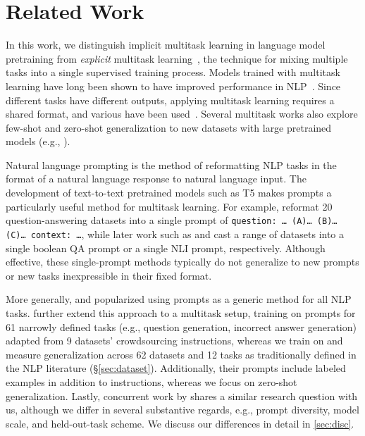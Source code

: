 \section{Related Work}\label{sec:related}

In this work, we distinguish implicit multitask learning in language model pretraining from \textit{explicit} multitask learning~\citep{DBLP:journals/ml/Caruana97}, the technique for mixing multiple tasks into a single supervised training process. Models trained with multitask learning have long been shown to have improved performance in NLP~\citep{DBLP:conf/icml/CollobertW08}. Since different tasks have different outputs, applying multitask learning requires a shared format, and various have been used~\citep{DBLP:journals/corr/HashimotoXTS16,DBLP:journals/corr/abs-1806-08730}. Several multitask works also explore few-shot and zero-shot generalization to new datasets with large pretrained models (e.g., \citealp{vu-etal-2020-exploring,ye2021crossfit}).

Natural language prompting is the method of reformatting NLP tasks in the format of a natural language response to natural language input. The development of text-to-text pretrained models such as T5 \citep{t5} makes prompts a particularly useful method for multitask learning. For example, \citet{unifiedqa} reformat 20 question-answering datasets into a single prompt of \texttt{question: …   (A)… (B)… (C)…  context: …}, while later work such as \citet{DBLP:journals/corr/abs-2104-04670} and \citet{DBLP:journals/corr/abs-2104-14690} cast a range of datasets into a single boolean QA prompt or a single NLI prompt, respectively. Although effective, these single-prompt methods typically do not generalize to new prompts or new tasks inexpressible in their fixed format.

More generally, \citet{schick-schutze-2021-exploiting} and \citet{gpt3} popularized using prompts as a generic method for all NLP tasks.
\citet{natural-inst} further extend this approach to a multitask setup, training on prompts for 61 narrowly defined tasks (e.g., question generation, incorrect answer generation) adapted from 9 datasets' crowdsourcing instructions, whereas we train on and measure generalization across 62 datasets and 12 tasks as traditionally defined in the NLP literature (\S\ref{sec:dataset}). Additionally, their prompts include labeled examples in addition to instructions, whereas we focus on zero-shot generalization. Lastly, concurrent work by \citet{flan} shares a similar research question with us, although we differ in several substantive regards, e.g., prompt diversity, model scale, and held-out-task scheme. We discuss our differences in detail in \autoref{sec:disc}.

